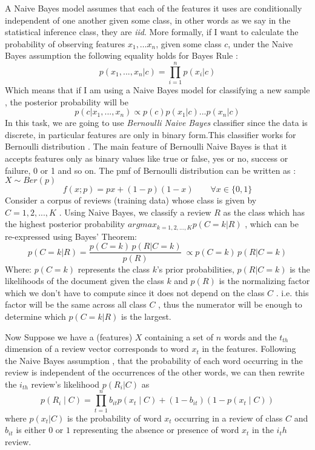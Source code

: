 \documentclass{article}
\begin{document}
 A Naive Bayes model assumes that each of the features it uses are conditionally independent of one another given some class, in other words as we say in the statistical inference class, they are \textit{iid}. More formally, if I want to calculate the probability of observing features $x_1,\ldots x_n$, given some class $c$, under the Naive Bayes assumption the following equality holds for Bayes Rule :
 \begin{equation*}
 p(x_1,..., x_n|c) = \prod_{i=1}^n p(x_i|c)
 \end{equation*}
 Which means that if I am using a Naive Bayes model for classifying a new sample , the posterior probability will be 
 \begin{equation*}
p(c|x_1,...,x_n) \propto p(c)p(x_1|c)...p(x_n|c)
 \end{equation*} 
 In this task, we are going to use \textit{Bernoulli Naive Bayes } classifier since the data is discrete, in particular features are only in binary form.This classifier works for Bernoulli distribution . The main feature of Bernoulli Naive Bayes is that it accepts features only as binary values like true or false, yes or no, success or failure, 0 or 1 and so on. 
 The pmf of Bernoulli distribution can be written as : $X \sim Ber(p)$ 
 \begin{equation*}
f(x;p) = px + (1-p)(1-x)  \qquad\forall x \in \{0,1\}
 \end{equation*} 
 Consider a corpus of reviews (training data) whose class is given by  $C=1,2,...,K$ . Using Naive Bayes, we classify a review $R$  as the class which has the highest posterior probability  $argmax_{k=1,2,\ldots,K} p(C=k \vert R)$ , which can be re-expressed using Bayes’ Theorem:
 \begin{equation*}
 p(C = k|R) = \frac{ p(C = k) \, p(R|C = k) }{p(R)} \ \propto p(C = k) \, p(R|C = k)
 \end{equation*}
 Where:
  $p(C = k)$ represents the class $k$'s prior probabilities, $p(R|C = k)$ is the likelihoods of the document given the class $k$ and $p(R)$  is the normalizing factor which we don't have to compute since it does not depend on the class $C$ . i.e. this factor will be the same across all class  $C$ , thus the numerator will be enough to determine which  $p(C=k|R)$  is the largest.
 
 Now Suppose we have a (features) $X$ containing a set of $n$ words and the $t_{th}$ dimension of a review vector corresponds to word $x_t$ in the features. Following the Naive Bayes assumption , that the probability of each word occurring in the review is independent of the occurrences of the other words, we can then rewrite the $i_{th}$  review's likelihood $p(R_i \vert C)$ as
 \begin{equation*}
 p(R_i \mid C ) = \prod_{t=1}^{n}b_{it}p(x_t \mid C) + ( 1 - b_{it} ) (1- p(x_t \mid C))
 \end{equation*}
 where $p(x_t \vert C)$  is the probability of word $x_t$ occurring in a review of class $C$ and $b_{it}$ is either $0$ or $1$ representing the absence or presence of word  $x_t$   in the  $i_th$  review.
 
\end{document}
